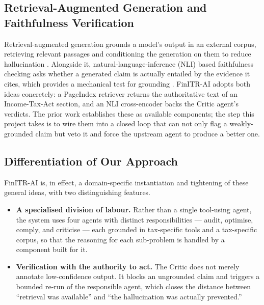 \subsection{Retrieval-Augmented Generation and Faithfulness Verification}
Retrieval-augmented generation grounds a model's output in an external corpus,
retrieving relevant passages and conditioning the generation on them to reduce
hallucination \cite{ref8}. Alongside it, natural-language-inference (NLI) based
faithfulness checking asks whether a generated claim is actually entailed by the
evidence it cites, which provides a mechanical test for grounding \cite{ref9}.
FinITR-AI adopts both ideas concretely: a PageIndex retriever returns the
authoritative text of an Income-Tax-Act section, and an NLI cross-encoder backs
the Critic agent's verdicts. The prior work establishes these as available
components; the step this project takes is to wire them into a closed loop that
can not only flag a weakly-grounded claim but veto it and force the upstream
agent to produce a better one.

\subsection{Differentiation of Our Approach}
FinITR-AI is, in effect, a domain-specific instantiation and tightening of these
general ideas, with two distinguishing features.

\begin{itemize}
    \item \textbf{A specialised division of labour.} Rather than a single
          tool-using agent, the system uses four agents with distinct
          responsibilities --- audit, optimise, comply, and criticise --- each
          grounded in tax-specific tools and a tax-specific corpus, so that the
          reasoning for each sub-problem is handled by a component built for it.
    \item \textbf{Verification with the authority to act.} The Critic does not
          merely annotate low-confidence output. It blocks an ungrounded claim
          and triggers a bounded re-run of the responsible agent, which closes
          the distance between ``retrieval was available'' and ``the
          hallucination was actually prevented.''
\end{itemize}

